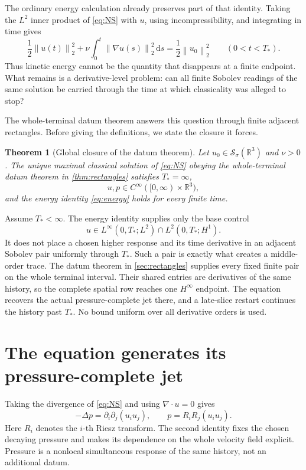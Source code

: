 \documentclass[11pt]{article}
\newtheorem{theorem}{Theorem}[section]
\theoremstyle{definition}
\theoremstyle{remark}
\newcommand{\R}{\mathbb R}
\newcommand{\Schwartz}{\mathcal S}
\newcommand{\norm}[1]{\left\lVert #1\right\rVert}
\newcommand{\dd}{\,\mathrm d}
\begin{document}
The ordinary energy calculation already preserves part of that identity.
Taking the \(L^2\) inner product of \eqref{eq:NS} with \(u\), using
incompressibility, and integrating in time gives
\begin{equation}
 \frac12\norm{u(t)}_2^2
 +\nu\int_0^t\norm{\nabla u(s)}_2^2\dd s
 =\frac12\norm{u_0}_2^2
 \qquad (0<t<T_*).
 \label{eq:energy}
\end{equation}
Thus kinetic energy cannot be the quantity that disappears at a finite
endpoint.  What remains is a derivative-level problem: can all finite
Sobolev readings of the same solution be carried through the time at which
classicality was alleged to stop?

The whole-terminal datum theorem answers this question through finite adjacent
rectangles.  Before giving the definitions, we state the closure it forces.

\begin{theorem}[Global closure of the datum theorem]
\label{thm:global}
Let \(u_0\in\Schwartz_\sigma(\R^3)\) and \(\nu>0\).  The unique maximal
classical solution of \eqref{eq:NS} obeying the whole-terminal datum theorem
in \cref{thm:rectangles} satisfies \(T_*=\infty\),
\[
 u,p\in C^\infty([0,\infty)\times\R^3),
\]
and the energy identity \eqref{eq:energy} holds for every finite time.
\end{theorem}

Assume \(T_*<\infty\).  The energy identity supplies only the base control
\[
 u\in L^\infty(0,T_*;L^2)\cap L^2(0,T_*;H^1).
\]
It does not place a chosen higher response and its time derivative in an
adjacent Sobolev pair uniformly through \(T_*\).  Such a pair is exactly what
creates a middle-order trace.  The datum theorem in
\cref{sec:rectangles} supplies every fixed finite pair on the whole terminal
interval.  Their shared entries are derivatives of the same history, so the
complete spatial row reaches one \(H^\infty\) endpoint.  The equation
recovers the actual pressure-complete jet there, and a late-slice restart
continues the history past \(T_*\).  No bound uniform over all derivative
orders is used.

\section{The equation generates its pressure-complete jet}
\label{sec:jet}

Taking the divergence of \eqref{eq:NS} and using \(\nabla\cdot u=0\) gives
\begin{equation}
 -\Delta p=\partial_i\partial_j(u_i u_j),
 \qquad p=R_iR_j(u_i u_j).
 \label{eq:pressure}
\end{equation}
Here \(R_i\) denotes the \(i\)-th Riesz transform.  The second identity fixes
the chosen decaying pressure and makes its dependence on the whole velocity
field explicit.  Pressure is a nonlocal simultaneous response of the same
history, not an additional datum.
\end{document}
